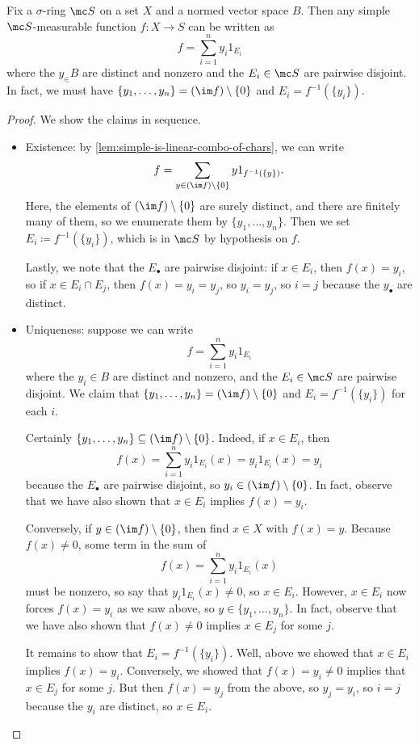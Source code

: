 \documentclass[../notes.tex]{subfiles}
\begin{document}
\begin{lemma}
	Fix a $\sigma$-ring $\mc S$ on a set $X$ and a normed vector space $B$. Then any simple $\mc S$-measurable function $f\colon X\to S$ can be written as
	\[f=\sum_{i=1}^ny_i1_{E_i}\]
	where the $y_\in B$ are distinct and nonzero and the $E_i\in\mc S$ are pairwise disjoint. In fact, we must have $\{y_1,\ldots,y_n\}=(\im f)\setminus\{0\}$ and $E_i=f^{-1}(\{y_i\})$.
\end{lemma}
\begin{proof}
	We show the claims in sequence.
	\begin{itemize}
		\item Existence: by \autoref{lem:simple-is-linear-combo-of-chars}, we can write
		\[f=\sum_{y\in(\im f)\setminus\{0\}}y1_{f^{-1}(\{y\})}.\]
		Here, the elements of $(\im f)\setminus\{0\}$ are surely distinct, and there are finitely many of them, so we enumerate them by $\{y_1,\ldots,y_n\}$. Then we set $E_i\coloneqq f^{-1}(\{y_i\})$, which is in $\mc S$ by hypothesis on $f$.

		Lastly, we note that the $E_\bullet$ are pairwise disjoint: if $x\in E_i$, then $f(x)=y_i$, so if $x\in E_i\cap E_j$, then $f(x)=y_i=y_j$, so $y_i=y_j$, so $i=j$ because the $y_\bullet$ are distinct.

		\item Uniqueness: suppose we can write
		\[f=\sum_{i=1}^ny_i1_{E_i}\]
		where the $y_i\in B$ are distinct and nonzero, and the $E_i\in\mc S$ are pairwise disjoint. We claim that $\{y_1,\ldots,y_n\}=(\im f)\setminus\{0\}$ and $E_i=f^{-1}(\{y_i\})$ for each $i$.

		Certainly $\{y_1,\ldots,y_n\}\subseteq(\im f)\setminus\{0\}$. Indeed, if $x\in E_i$, then
		\[f(x)=\sum_{i=1}^ny_i1_{E_i}(x)=y_i1_{E_i}(x)=y_i\]
		because the $E_\bullet$ are pairwise disjoint, so $y_i\in(\im f)\setminus\{0\}$. In fact, observe that we have also shown that $x\in E_i$ implies $f(x)=y_i$.
		
		Conversely, if $y\in(\im f)\setminus\{0\}$, then find $x\in X$ with $f(x)=y$. Because $f(x)\ne0$, some term in the sum of
		\[f(x)=\sum_{i=1}^ny_i1_{E_i}(x)\]
		must be nonzero, so say that $y_i1_{E_i}(x)\ne0$, so $x\in E_i$. However, $x\in E_i$ now forces $f(x)=y_i$ as we saw above, so $y\in\{y_1,\ldots,y_n\}$. In fact, observe that we have also shown that $f(x)\ne0$ implies $x\in E_j$ for some $j$.

		It remains to show that $E_i=f^{-1}(\{y_i\})$. Well, above we showed that $x\in E_i$ implies $f(x)=y_i$. Conversely, we showed that $f(x)=y_i\ne0$ implies that $x\in E_j$ for some $j$. But then $f(x)=y_j$ from the above, so $y_j=y_i$, so $i=j$ because the $y_i$ are distinct, so $x\in E_i$.
		\qedhere
	\end{itemize}
\end{proof}
\end{document}
